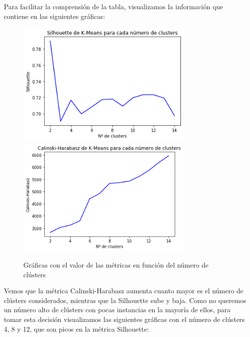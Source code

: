 \documentclass[a4]{article}
\begin{document}
Para facilitar la comprensión de la tabla, visualizamos la información que contiene en las siguientes gráficas:

\begin{figure}[H]
  \centering
  \caption{Gráficas con el valor de las métricas en función del número de clústers}
  \includegraphics[width=87mm]{imagenes/c3_kmeans_sil}
  \includegraphics[width=87mm]{imagenes/c3_kmeans_cal}
\end{figure}

Vemos que la métrica Calinski-Harabasz aumenta cuanto mayor es el número de clústers considerados, mientras que la Silhouette sube y baja. Como no queremos un número alto de clústers con pocas instancias en la mayoría de ellos, para tomar esta decisión visualizamos las siguientes gráficas con el número de clústers 4, 8 y 12, que son picos en la métrica Silhouette:
\end{document}
